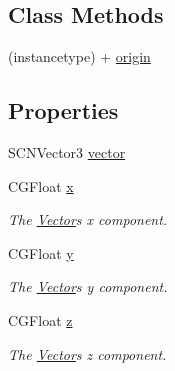 \subsection*{Class Methods}
\begin{DoxyCompactItemize}
\item 
(instancetype) + \hyperlink{interface_vector_a0389cf614e1d9cdfb96ef55978e3f329}{origin}
\end{DoxyCompactItemize}
\subsection*{Properties}
\begin{DoxyCompactItemize}
\item 
S\+C\+N\+Vector3 \hyperlink{interface_vector_a2adc4346de245274fbe30c58d96e68cc}{vector}
\item 
\hypertarget{interface_vector_ad65434f3295c919b6c6acbe682104572}{}C\+G\+Float \hyperlink{interface_vector_ad65434f3295c919b6c6acbe682104572}{x}\label{interface_vector_ad65434f3295c919b6c6acbe682104572}

\begin{DoxyCompactList}\small\item\em The \hyperlink{interface_vector}{Vector}\textquotesingle{}s {\ttfamily x} component. \end{DoxyCompactList}\item 
\hypertarget{interface_vector_a92d146a8b04ace2dd31e1169d704d973}{}C\+G\+Float \hyperlink{interface_vector_a92d146a8b04ace2dd31e1169d704d973}{y}\label{interface_vector_a92d146a8b04ace2dd31e1169d704d973}

\begin{DoxyCompactList}\small\item\em The \hyperlink{interface_vector}{Vector}\textquotesingle{}s {\ttfamily y} component. \end{DoxyCompactList}\item 
\hypertarget{interface_vector_a2ff2df69ab12d49bbb23cdf35b114120}{}C\+G\+Float \hyperlink{interface_vector_a2ff2df69ab12d49bbb23cdf35b114120}{z}\label{interface_vector_a2ff2df69ab12d49bbb23cdf35b114120}

\begin{DoxyCompactList}\small\item\em The \hyperlink{interface_vector}{Vector}\textquotesingle{}s {\ttfamily z} component. \end{DoxyCompactList}\end{DoxyCompactItemize}


